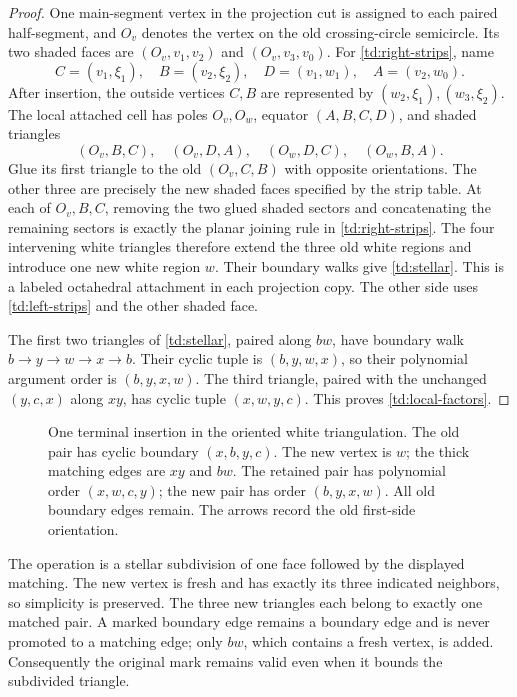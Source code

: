 \documentclass[11pt]{article}
\numberwithin{equation}{section}
\theoremstyle{definition}
\begin{document}
\begin{proof}
One main-segment vertex in the projection cut is assigned to each
paired half-segment, and \(O_v\) denotes the vertex on the old
crossing-circle semicircle. Its two shaded faces are
\((O_v,v_1,v_2)\) and \((O_v,v_3,v_0)\).
For \eqref{td:right-strips}, name
\[
 C=(v_1,\xi_1),\quad B=(v_2,\xi_2),\quad
 D=(v_1,w_1),\quad A=(v_2,w_0).
\]
After insertion, the outside vertices \(C,B\) are represented
by \((w_2,\xi_1),(w_3,\xi_2)\). The local attached cell has poles
\(O_v,O_w\), equator \((A,B,C,D)\), and shaded triangles
\[
 (O_v,B,C),\quad (O_v,D,A),\quad
 (O_w,D,C),\quad (O_w,B,A).
\]
Glue its first triangle to the old \((O_v,C,B)\) with opposite
orientations. The other three are precisely the new shaded faces
specified by the strip table. At each of \(O_v,B,C\), removing the
two glued shaded sectors and concatenating the remaining sectors
is exactly the planar joining rule in \eqref{td:right-strips}.
The four intervening white triangles therefore extend the three
old white regions and introduce one new white region \(w\).
Their boundary walks give \eqref{td:stellar}. This is a labeled
octahedral attachment in each projection copy. The other side uses
\eqref{td:left-strips} and the other shaded face.

The first two triangles of \eqref{td:stellar}, paired along \(bw\),
have boundary walk \(b\to y\to w\to x\to b\).
Their cyclic tuple is \((b,y,w,x)\), so their polynomial argument
order is \((b,y,x,w)\). The third triangle, paired with the unchanged
\((y,c,x)\) along \(xy\), has cyclic tuple \((x,w,y,c)\).
This proves \eqref{td:local-factors}.
\end{proof}

\begin{figure}[htbp]
\centering

\caption{One terminal insertion in the oriented white triangulation.
The old pair has cyclic boundary \((x,b,y,c)\). The new vertex is
\(w\); the thick matching edges are \(xy\) and \(bw\).
The retained pair has polynomial order \((x,w,c,y)\);
the new pair has order \((b,y,x,w)\). All old boundary edges remain.
The arrows record the old first-side orientation.}
\label{td:patch-figure}
\end{figure}

The operation is a stellar subdivision of one face followed by the
displayed matching. The new vertex is fresh and has exactly its
three indicated neighbors, so simplicity is preserved. The three
new triangles each belong to exactly one matched pair. A marked
boundary edge remains a boundary edge and is never promoted to a
matching edge; only \(bw\), which contains a fresh vertex, is added.
Consequently the original mark remains valid even when it bounds
the subdivided triangle.
\end{document}
